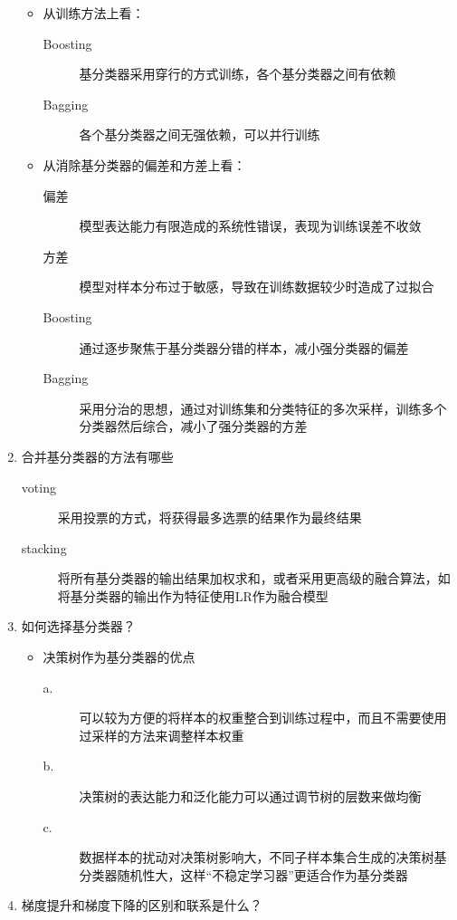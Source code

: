 \documentclass[UTF8]{article}%
\begin{document}
\begin{enumerate}
\begin{itemize}
					\item 从训练方法上看：
						\begin{description}
								\item[Boosting] 基分类器采用穿行的方式训练，各个基分类器之间有依赖
								\item[Bagging]  各个基分类器之间无强依赖，可以并行训练
					\end{description}
					\item 从消除基分类器的偏差和方差上看：
						\begin{description}
							\item[偏差] 模型表达能力有限造成的系统性错误，表现为训练误差不收敛
							\item[方差] 模型对样本分布过于敏感，导致在训练数据较少时造成了过拟合
							\item[Boosting] 通过逐步聚焦于基分类器分错的样本，减小强分类器的偏差
							\item[Bagging]  采用分治的思想，通过对训练集和分类特征的多次采样，训练多个分类器然后综合，减小了强分类器的方差
						\end{description}
				\end{itemize}
				\item 合并基分类器的方法有哪些
				\begin{description}
					\item[voting] 采用投票的方式，将获得最多选票的结果作为最终结果
					\item[stacking] 将所有基分类器的输出结果加权求和，或者采用更高级的融合算法，如将基分类器的输出作为特征使用LR作为融合模型
				\end{description}
				\item 	如何选择基分类器？
				\begin{itemize}
					\item 决策树作为基分类器的优点
					\begin{description}
						\item[a.] 可以较为方便的将样本的权重整合到训练过程中，而且不需要使用过采样的方法来调整样本权重
						\item[b.] 决策树的表达能力和泛化能力可以通过调节树的层数来做均衡
						\item[c.] 数据样本的扰动对决策树影响大，不同子样本集合生成的决策树基分类器随机性大，这样“不稳定学习器”更适合作为基分类器
					\end{description}
				\end{itemize}
			\item 梯度提升和梯度下降的区别和联系是什么？
			\begin{description}

\end{description}
\end{enumerate}
\end{document}
